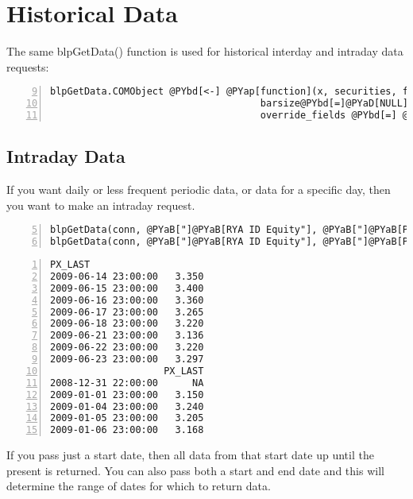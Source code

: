 \documentclass[a4paper]{article}
\begin{document}
    



\section{Historical Data} %
\label{sec:historical_data}

The same blpGetData() function is used for historical interday and intraday data requests:


\begin{Verbatim}[commandchars=@\[\],numbers=left,firstnumber=9,stepnumber=1]
blpGetData.COMObject @PYbd[<-] @PYap[function](x, securities, fields, start@PYbd[=]@PYaD[NULL], end@PYbd[=]@PYaD[NULL],
                                     barsize@PYbd[=]@PYaD[NULL], barfields@PYbd[=]@PYaD[NULL], retval@PYbd[=]@PYaD[NULL], 
                                     override_fields @PYbd[=] @PYaD[NULL], overrides @PYbd[=] @PYaD[NULL], currency @PYbd[=] @PYaD[NULL], ...){
\end{Verbatim}

    

\subsection{Intraday Data} %
\label{sub:intraday_data}

If you want daily or less frequent periodic data, or data for a specific day, then you want to make an intraday request.


\begin{Verbatim}[commandchars=@\[\],numbers=left,firstnumber=5,stepnumber=1]
blpGetData(conn, @PYaB["]@PYaB[RYA ID Equity"], @PYaB["]@PYaB[PX_LAST"], Sys.Date() @PYbd[-] @PYaR[10])
blpGetData(conn, @PYaB["]@PYaB[RYA ID Equity"], @PYaB["]@PYaB[PX_LAST"], @PYaB["]@PYaB[2009-01-01"], @PYaB["]@PYaB[2009-01-07"])
\end{Verbatim}

    

\begin{Verbatim}[commandchars=@\[\],numbers=left,firstnumber=1,stepnumber=1]
                    PX_LAST
2009-06-14 23:00:00   3.350
2009-06-15 23:00:00   3.400
2009-06-16 23:00:00   3.360
2009-06-17 23:00:00   3.265
2009-06-18 23:00:00   3.220
2009-06-21 23:00:00   3.136
2009-06-22 23:00:00   3.220
2009-06-23 23:00:00   3.297
                    PX_LAST
2008-12-31 22:00:00      NA
2009-01-01 23:00:00   3.150
2009-01-04 23:00:00   3.240
2009-01-05 23:00:00   3.205
2009-01-06 23:00:00   3.168
\end{Verbatim}

    

If you pass just a start date, then all data from that start date up until the present is returned. You can also pass both a start and end date and this will determine the range of dates for which to return data.


\end{document}
